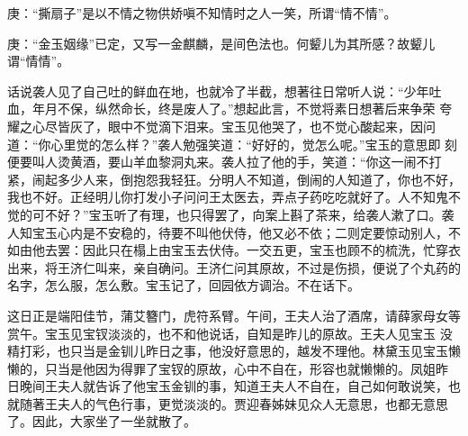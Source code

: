 

\begin{parag}
    \begin{note}庚：“撕扇子”是以不情之物供娇嗔不知情时之人一笑，所谓“情不情”。\end{note}
\end{parag}


\begin{parag}
    \begin{note}庚：“金玉姻缘”已定，又写一金麒麟，是间色法也。何颦儿为其所感？故颦儿谓“情情”。\end{note}
\end{parag}


\begin{parag}
    话说袭人见了自己吐的鲜血在地，也就冷了半截，想著往日常听人说：“少年吐血，年月不保，纵然命长，终是废人了。”想起此言，不觉将素日想著后来争荣 夸耀之心尽皆灰了，眼中不觉滴下泪来。宝玉见他哭了，也不觉心酸起来，因问道：“你心里觉的怎么样？”袭人勉强笑道：“好好的，觉怎么呢。”宝玉的意思即 刻便要叫人烫黄酒，要山羊血黎洞丸来。袭人拉了他的手，笑道：“你这一闹不打紧，闹起多少人来，倒抱怨我轻狂。分明人不知道，倒闹的人知道了，你也不好， 我也不好。正经明儿你打发小子问问王太医去，弄点子药吃吃就好了。人不知鬼不觉的可不好？”宝玉听了有理，也只得罢了，向案上斟了茶来，给袭人漱了口。袭人知宝玉心内是不安稳的，待要不叫他伏侍，他又必不依；二则定要惊动别人，不如由他去罢：因此只在榻上由宝玉去伏侍。一交五更，宝玉也顾不的梳洗，忙穿衣 出来，将王济仁叫来，亲自确问。王济仁问其原故，不过是伤损，便说了个丸药的名字，怎么服，怎么敷。宝玉记了，回园依方调治。不在话下。
\end{parag}


\begin{parag}
    这日正是端阳佳节，蒲艾簪门，虎符系臂。午间，王夫人治了酒席，请薛家母女等赏午。宝玉见宝钗淡淡的，也不和他说话，自知是昨儿的原故。王夫人见宝玉 没精打彩，也只当是金钏儿昨日之事，他没好意思的，越发不理他。林黛玉见宝玉懒懒的，只当是他因为得罪了宝钗的原故，心中不自在，形容也就懒懒的。凤姐昨 日晚间王夫人就告诉了他宝玉金钏的事，知道王夫人不自在，自己如何敢说笑，也就随著王夫人的气色行事，更觉淡淡的。贾迎春姊妹见众人无意思，也都无意思了。因此，大家坐了一坐就散了。
\end{parag}


